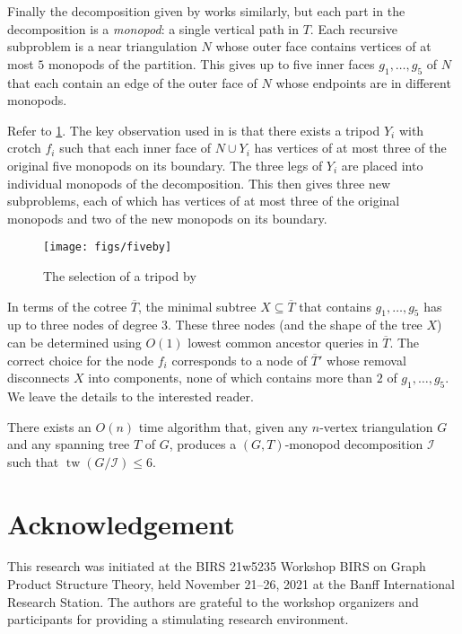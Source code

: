 \documentclass{patmorin}
\DeclareMathOperator{\tw}{tw}
\begin{document}
Finally the decomposition given by \citet{ueckerdt.wood.ea:improved} works similarly, but each part in the decomposition is a \emph{monopod}: a single vertical path in $T$. Each recursive subproblem is a near triangulation $N$ whose outer face contains vertices of at most $5$ monopods of the partition. This gives up to five inner faces $g_1,\ldots,g_5$ of $N$ that each contain an edge of the outer face of $N$ whose endpoints are in different monopods.

Refer to \cref{uwy}.  The key observation used in \cite{ueckerdt.wood.ea:improved} is that there exists a tripod $Y_i$ with crotch $f_i$ such that each inner face of $N\cup Y_i$ has vertices of at most three of the original five monopods on its boundary.  The three legs of $Y_i$ are placed into individual monopods of the decomposition.  This then gives three new subproblems, each of which has vertices of at most three of the original monopods and two of the new monopods on its boundary.

\begin{figure}
  \begin{center}
    \texttt{[image: figs/fiveby]}
  \end{center}
  \caption{The selection of a tripod by \citet{ueckerdt.wood.ea:improved}}
  \label{uwy}
\end{figure}

In terms of the cotree $\overline{T}$, the minimal subtree $X \subseteq\overline{T}$ that contains $g_1,\ldots,g_5$ has up to three nodes of degree $3$.  These three nodes (and the shape of the tree $X$) can be determined using $O(1)$ lowest common ancestor queries in $\overline{T}$.  The correct choice for the node $f_i$ corresponds to a node of $\overline{T}'$ whose removal disconnects $X$ into components, none of which contains more than $2$ of $g_1,\ldots,g_5$.  We leave the details to the interested reader.

\begin{thm}
  There exists an $O(n)$ time algorithm that, given any $n$-vertex triangulation $G$ and any spanning tree $T$ of $G$, produces a $(G,T)$-monopod decomposition $\mathcal{I}$ such that $\tw(G/\mathcal{I})\le 6$.
\end{thm}


\section*{Acknowledgement}

This research was initiated at the BIRS 21w5235 Workshop BIRS on Graph Product Structure Theory, held November 21--26, 2021 at the Banff International Research Station.  The authors are grateful to the workshop organizers and participants for providing a stimulating research environment.




\end{document}
